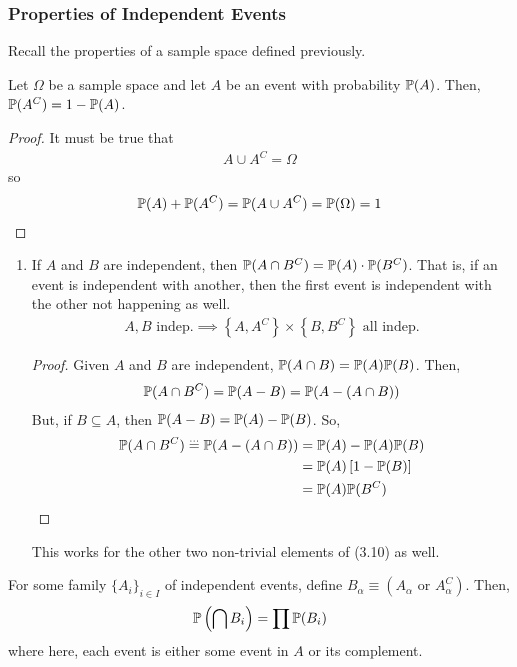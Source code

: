 \subsubsection{Properties of Independent Events}
Recall the properties of a sample space defined previously.
\begin{lemma}
    Let $\Omega$ be a sample space and let $A$ be an event with probability $\mathbb{P}(A)$. Then, $\mathbb{P}(A^C) = 1- \mathbb{P}(A)$.
    \begin{proof}
        It must be true that
        \begin{align}
            A \cup A^C = \Omega
        \end{align}
        so
        \begin{align}
            \mathbb{P}(A) + \mathbb{P}(A^C) = \mathbb{P}(A \cup A^C) = \mathbb{P}(\Omega) = 1
        \end{align}
    \end{proof}
\end{lemma}
\begin{enumerate}
    \item If $A$ and $B$ are independent, then $\mathbb{P}(A \cap B^C) = \mathbb{P}(A) \cdot \mathbb{P}(B^C)$. That is, if an event is independent with another, then the first event is independent with the other not happening as well.
    \begin{align}
        A, B \text{ indep.} \implies \left\{ A, A^C \right\} \times \left\{ B, B^C \right\} \text{ all indep.}
    \end{align}
    \begin{proof}
        Given $A$ and $B$ are independent, $\mathbb{P}(A \cap B) = \mathbb{P}(A)\mathbb{P}(B)$. Then,
        \begin{align}
            \mathbb{P}(A \cap B^C) = \mathbb{P}(A - B) = \mathbb{P}(A - (A \cap B))
        \end{align}
        But, if $B \subseteq A$, then $\mathbb{P}(A - B) = \mathbb{P}(A) - \mathbb{P}(B)$. So,
        \begin{align}
            \mathbb{P}(A \cap B^C) \stackrel{\ldots}{=} \mathbb{P}(A - (A \cap B)) &= \mathbb{P}(A) - \mathbb{P}(A)\mathbb{P}(B)\\
            &= \mathbb{P}(A) \left[ 1 - \mathbb{P}(B) \right]\\
            &= \mathbb{P}(A) \mathbb{P}(B^C)
        \end{align}
    \end{proof}
    This works for the other two non-trivial elements of (3.10) as well.
\end{enumerate}
\begin{proposition}
    For some family $\{ A_i \}_{i \in I}$ of independent events, define $B_\alpha \equiv (A_\alpha \text{ or } A_\alpha^C)$. Then,
    \begin{align}
        \mathbb{P}\left( \bigcap B_i \right) = \prod \mathbb{P}(B_i)
    \end{align}
    where here, each event is either some event in $A$ or its complement.
\end{proposition}

